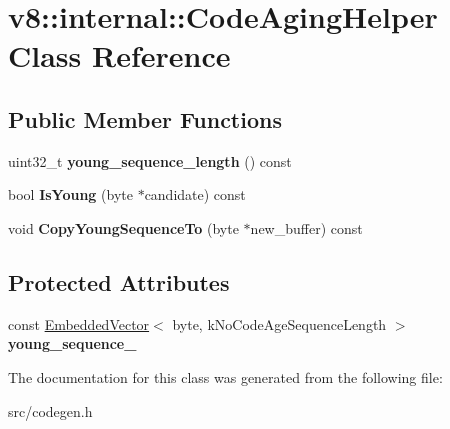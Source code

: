 \hypertarget{classv8_1_1internal_1_1_code_aging_helper}{}\section{v8\+:\+:internal\+:\+:Code\+Aging\+Helper Class Reference}
\label{classv8_1_1internal_1_1_code_aging_helper}
\subsection*{Public Member Functions}
\begin{DoxyCompactItemize}
\item 
\hypertarget{classv8_1_1internal_1_1_code_aging_helper_a22f4324a74141eb95ca45caf83c30133}{}uint32\+\_\+t {\bfseries young\+\_\+sequence\+\_\+length} () const \label{classv8_1_1internal_1_1_code_aging_helper_a22f4324a74141eb95ca45caf83c30133}

\item 
\hypertarget{classv8_1_1internal_1_1_code_aging_helper_aed9d12b1e54be66604ccadade0728c9f}{}bool {\bfseries Is\+Young} (byte $\ast$candidate) const \label{classv8_1_1internal_1_1_code_aging_helper_aed9d12b1e54be66604ccadade0728c9f}

\item 
\hypertarget{classv8_1_1internal_1_1_code_aging_helper_af6fb5448eebff54dcdeabe36752e900e}{}void {\bfseries Copy\+Young\+Sequence\+To} (byte $\ast$new\+\_\+buffer) const \label{classv8_1_1internal_1_1_code_aging_helper_af6fb5448eebff54dcdeabe36752e900e}

\end{DoxyCompactItemize}
\subsection*{Protected Attributes}
\begin{DoxyCompactItemize}
\item 
\hypertarget{classv8_1_1internal_1_1_code_aging_helper_a3b3c8139df06ad8b2849de74b05f5497}{}const \hyperlink{classv8_1_1internal_1_1_embedded_vector}{Embedded\+Vector}$<$ byte, k\+No\+Code\+Age\+Sequence\+Length $>$ {\bfseries young\+\_\+sequence\+\_\+}\label{classv8_1_1internal_1_1_code_aging_helper_a3b3c8139df06ad8b2849de74b05f5497}

\end{DoxyCompactItemize}


The documentation for this class was generated from the following file\+:\begin{DoxyCompactItemize}
\item 
src/codegen.\+h\end{DoxyCompactItemize}
